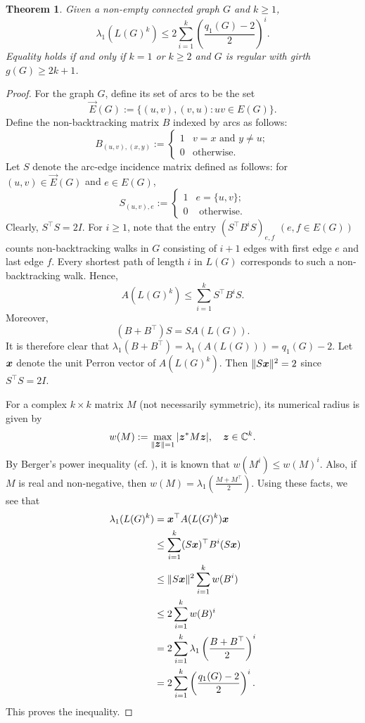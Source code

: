\documentclass[10pt,a4paper]{article}
\theoremstyle{plain}
\newtheorem{theorem}{Theorem}[section]
\numberwithin{equation}{section}
\def\x{\mbox{\boldmath $x$}}
\def\z{\mbox{\boldmath $z$}}
\begin{document}
\begin{theorem}\label{thm:spectral_radius_line_graph_power} Given a non-empty connected graph $G$ and $k\ge 1$, 
 \[ \lambda_1(L(G)^k)\le 2\sum_{i=1}^k \left(\frac{q_1(G)-2}{2}\right)^i.\]  
 Equality holds if and only if $k=1$ or $k\ge 2$ and $G$ is regular with girth $g(G)\ge 2k+1$. 
\end{theorem}



\begin{proof} For the graph $G$, define its set of arcs to be the set 
\[\overrightarrow{E}(G):=\{(u,v), (v,u): uv\in E(G)\}.\]
Define the non-backtracking matrix $B$ indexed by arcs as follows:
\[ B_{(u,v), (x,y)}:= 
\begin{cases}
    1 & v = x \text{ and }y\ne u;\\
    0 & \text{otherwise}.
\end{cases}\]
Let $S$ denote the arc-edge incidence matrix defined as follows: for $(u,v)\in \overrightarrow{E}(G)$ and $e\in E(G)$, 
\[ S_{(u,v), e} :=
\begin{cases}
    1 & e = \{u,v\};\\
    0 & \text{ otherwise}.
\end{cases}\]
Clearly, $S^\top S = 2I$. For $i\ge 1$, note that the entry $(S^\top B^iS)_{e,f}$ $(e,f\in E(G))$ counts non-backtracking walks in $G$ consisting of $i+1$ edges with first edge $e$ and last edge $f$. Every shortest path of length $i$ in $L(G)$ corresponds to such a non-backtracking walk. Hence, 
\begin{equation}\label{eq:adjacency_line_comparison}
   A(L(G)^k)\le \sum_{i=1}^k S^\top B^iS. 
\end{equation}
Moreover, 
\begin{equation}\label{eq:B_and_L_G}
    (B + B^\top)S = SA(L(G)). 
\end{equation}
It is therefore clear that $\lambda_1(B+B^\top) = \lambda_1(A(L(G))) = q_1(G)-2$. Let $\x$ denote the unit Perron vector of $A(L(G)^k)$. Then $\|S\x\|^2 = 2$ since $S^\top S = 2I$. 

For a complex $k\times k$ matrix $M$ (not necessarily symmetric), its numerical radius is given by 
\[w(M):=\max_{\|\z\|=1}|\z^* M\z|,\quad \z\in \mathbb{C}^k.\]
By Berger's power inequality (cf. \cite{Berger_Stampfli_1967}), it is known that $w(M^i)\le w(M)^i$. Also, if $M$ is real and non-negative, then $w(M) = \lambda_1\left(\frac{M+M^\top}{2}\right)$. Using these facts, we see that 
\begin{align*}
    \lambda_1(L(G)^k) & = \x^\top A(L(G)^k)\x\\
    & \le \sum_{i=1}^k (S\x)^\top B^i (S\x)\\
    & \le \|S\x\|^2 \sum_{i=1}^k  w(B^i)\\
    & \le 2 \sum_{i=1}^k  w(B)^i\\
    & = 2\sum_{i=1}^k \lambda_1\left(\frac{B+B^\top}{2}\right)^i \\
    & = 2\sum_{i=1}^k \left(\frac{q_1(G)-2}{2}\right)^i. 
\end{align*}
This proves the inequality. 


\end{proof}
\end{document}

